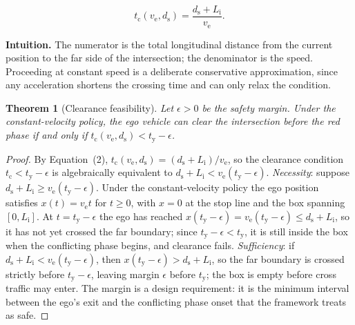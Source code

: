 \documentclass[conference, a4paper]{IEEEtran}
\theoremstyle{plain}
\newtheorem{theorem}{Theorem}
\newcommand{\ds}{d_{\mathrm{s}}}
\newcommand{\tclear}{t_{\mathrm{c}}}
\newcommand{\tred}{t_{\mathrm{y}}}
\newcommand{\Li}{L_{\mathrm{i}}}
\newcommand{\ve}{v_{\mathrm{e}}}
\begin{document}
\begin{equation}
\tclear(\ve, \ds) = \frac{\ds + \Li}{\ve}.
\label{eq:clear}
\end{equation}

\textbf{Intuition.} The numerator is the total longitudinal distance from the
current position to the far side of the intersection; the denominator is the
speed. Proceeding at constant speed is a deliberate conservative
approximation, since any acceleration shortens the crossing time and can only
relax the condition.

\begin{theorem}[Clearance feasibility]
\label{thm:clear}
Let $\epsilon > 0$ be the safety margin. Under the constant-velocity policy,
the ego vehicle can clear the intersection before the red phase if and only
if $\tclear(\ve, \ds) < \tred - \epsilon$.
\end{theorem}

\begin{proof}
By Equation~(2), $\tclear(\ve,\ds) = (\ds + \Li)/\ve$, so the clearance
condition $\tclear < \tred - \epsilon$ is algebraically equivalent to
$\ds + \Li < \ve(\tred - \epsilon)$.
\emph{Necessity}: suppose $\ds + \Li \geq \ve(\tred - \epsilon)$. Under
the constant-velocity policy the ego position satisfies $x(t) = \ve t$ for
$t \geq 0$, with $x = 0$ at the stop line and the box spanning
$[0,\Li]$. At $t = \tred - \epsilon$ the ego has reached
$x(\tred - \epsilon) = \ve(\tred - \epsilon) \leq \ds + \Li$, so it has
not yet crossed the far boundary; since $\tred - \epsilon < \tred$, it is
still inside the box when the conflicting phase begins, and clearance fails.
\emph{Sufficiency}: if $\ds + \Li < \ve(\tred - \epsilon)$, then
$x(\tred - \epsilon) > \ds + \Li$, so the far boundary is crossed strictly
before $\tred - \epsilon$, leaving margin $\epsilon$ before $\tred$; the box
is empty before cross traffic may enter. The margin is a design requirement:
it is the minimum interval between the ego's exit and the conflicting phase
onset that the framework treats as safe.
\end{proof}
\end{document}
